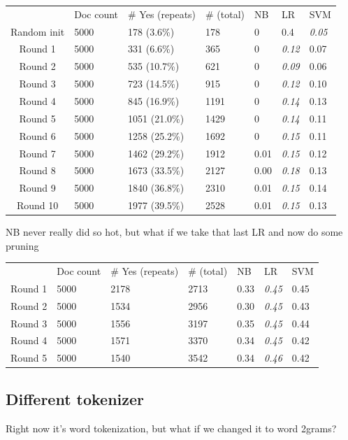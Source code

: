\documentclass[11pt]{article} %
\begin{document}
\begin{tabular}{|c|*{6}{l|}}
\rowcolor{gray!50} & Doc count & \# Yes (repeats) & \# (total) & NB & LR & SVM \\
Random init & 5000 & 178 (3.6\%) & 178 & 0 & 0.4 & \emph{0.05} \\
Round 1 & 5000 & 331 (6.6\%) & 365 & 0 & \emph{0.12} & 0.07 \\
Round 2 & 5000 & 535 (10.7\%) & 621 & 0 & \emph{0.09} & 0.06 \\
Round 3 & 5000 & 723 (14.5\%) & 915 & 0 & \emph{0.12} & 0.10 \\
Round 4 & 5000 & 845 (16.9\%) & 1191 & 0 & \emph{0.14}& 0.13\\
Round 5 & 5000 & 1051 (21.0\%) & 1429 & 0 & \emph{0.14} & 0.11\\
Round 6 & 5000 & 1258 (25.2\%) & 1692 & 0 & \emph{0.15} & 0.11\\
Round 7 & 5000 & 1462 (29.2\%) & 1912 & 0.01 & \emph{0.15} & 0.12\\
Round 8 & 5000 & 1673 (33.5\%) & 2127 & 0.00 & \emph{0.18} & 0.13\\
Round 9 & 5000 & 1840 (36.8\%) & 2310 & 0.01 & \emph{0.15} & 0.14\\
Round 10 & 5000 & 1977 (39.5\%) & 2528 & 0.01 & \emph{0.15} & 0.13 \\
\end{tabular}
NB never really did so hot, but what if we take that last LR and now do some pruning\\
\begin{tabular}{|c|*{6}{l}}
\rowcolor{gray!50} & Doc count & \# Yes (repeats) & \# (total) & NB & LR & SVM \\
Round 1 & 5000 & 2178 & 2713 & 0.33 & \emph{0.45} & 0.45 \\
Round 2 & 5000 & 1534 & 2956 & 0.30 & \emph{0.45} & 0.43 \\
Round 3 & 5000 & 1556 & 3197 & 0.35 & \emph{0.45} & 0.44 \\
Round 4 & 5000 & 1571 & 3370 & 0.34 & \emph{0.45} & 0.42 \\
Round 5 & 5000 & 1540 & 3542 & 0.34 & \emph{0.46} & 0.42
\end{tabular}


\subsection{Different tokenizer}
Right now it's word tokenization, but what if we changed it to word 2grams? \\
\end{document}
